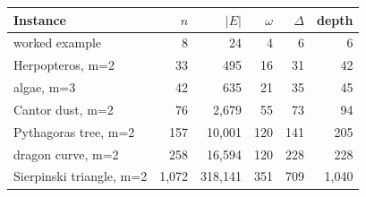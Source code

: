 \begin{tabular}{lrrrrr}
\toprule
Instance & $n$ & $|E|$ & $\omega$ & $\Delta$ & depth \\
\midrule
worked example & 8 & 24 & 4 & 6 & 6 \\
Herpopteros, m=2 & 33 & 495 & 16 & 31 & 42 \\
algae, m=3 & 42 & 635 & 21 & 35 & 45 \\
Cantor dust, m=2 & 76 & 2,679 & 55 & 73 & 94 \\
Pythagoras tree, m=2 & 157 & 10,001 & 120 & 141 & 205 \\
dragon curve, m=2 & 258 & 16,594 & 120 & 228 & 228 \\
Sierpinski triangle, m=2 & 1,072 & 318,141 & 351 & 709 & 1,040 \\
\bottomrule
\end{tabular}
